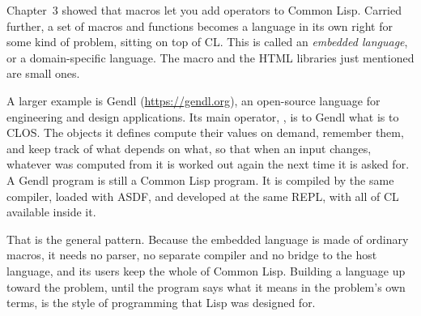 Chapter~3 showed that macros let you add operators to Common Lisp.
Carried further, a set of macros and functions becomes a language in
its own right for some kind of problem, sitting on top of CL. This is
called an \emph{embedded language}, or a domain-specific language.
The  macro and the HTML libraries just mentioned are small
ones.

A larger example is Gendl (\url{https://gendl.org}), an open-source
language for engineering and design applications. Its main operator,
, is to Gendl what  is to CLOS.
The objects it defines compute their values on demand, remember them,
and keep track of what depends on what, so that when an input changes,
whatever was computed from it is worked out again the next time it is
asked for. A Gendl program is still a Common Lisp program. It is
compiled by the same compiler, loaded with ASDF, and developed at the
same REPL, with all of CL available inside it.

That is the general pattern. Because the embedded language is made of
ordinary macros, it needs no parser, no separate compiler and no
bridge to the host language, and its users keep the whole of Common
Lisp. Building a language up toward the problem, until the program
says what it means in the problem's own terms, is the style of
programming that Lisp was designed for.
